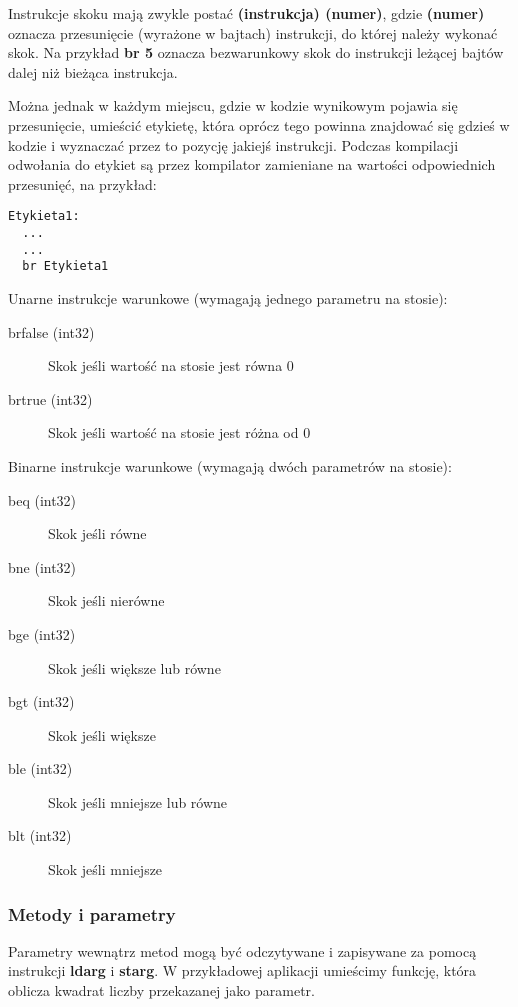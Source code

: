 Instrukcje skoku mają zwykle postać {\bf (instrukcja) (numer)}, gdzie {\bf (numer)} oznacza przesunięcie
(wyrażone w bajtach) instrukcji, do której należy wykonać skok. Na przykład {\bf br 5} oznacza bezwarunkowy
skok do instrukcji leżącej bajtów dalej niż bieżąca instrukcja. 

Można jednak w każdym miejscu, gdzie w kodzie wynikowym pojawia się przesunięcie, umieścić
etykietę, która oprócz tego powinna znajdować się gdzieś w kodzie i wyznaczać przez to pozycję
jakiejś instrukcji. Podczas kompilacji odwołania do etykiet są przez kompilator zamieniane na wartości
odpowiednich przesunięć, na przykład:

\begin{scriptsize}
\begin{verbatim}
Etykieta1:
  ...
  ...
  br Etykieta1
\end{verbatim}
\end{scriptsize}

Unarne instrukcje warunkowe (wymagają jednego parametru na stosie):

\begin{description}
\item [brfalse (int32)] Skok jeśli wartość na stosie jest równa 0
\item [brtrue (int32)] Skok jeśli wartość na stosie jest różna od 0
\end{description}

Binarne instrukcje warunkowe (wymagają dwóch parametrów na stosie):

\begin{description}
\item [beq (int32)] Skok jeśli równe
\item [bne (int32)] Skok jeśli nierówne
\item [bge (int32)] Skok jeśli większe lub równe
\item [bgt (int32)] Skok jeśli większe
\item [ble (int32)] Skok jeśli mniejsze lub równe
\item [blt (int32)] Skok jeśli mniejsze
\end{description}

\subsubsection{Metody i parametry}

Parametry wewnątrz metod mogą być odczytywane i zapisywane za pomocą instrukcji {\bf ldarg} i 
{\bf starg}. W przykładowej aplikacji umieścimy funkcję, która oblicza kwadrat liczby przekazanej
jako parametr.

